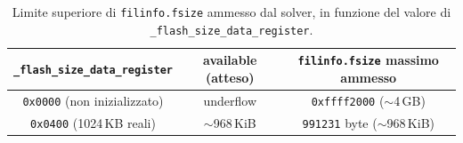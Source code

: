 \begin{table}[H]
        \centering
        \small
        \begin{tabular}{c c c}
        \toprule
        \textbf{\texttt{\_flash\_size\_data\_register}} & \textbf{available (atteso)} & \textbf{\texttt{filinfo.fsize} massimo ammesso} \\
        \midrule
        \texttt{0x0000} (non inizializzato) & underflow & \texttt{0xffff2000} ($\sim$4\,GB) \\
        \midrule
        \texttt{0x0400} (1024\,KB reali) & $\sim$968\,KiB & \texttt{991231} byte ($\sim$968\,KiB) \\
        \bottomrule
        \end{tabular}
        \caption{Limite superiore di \texttt{filinfo.fsize} ammesso dal solver, in funzione del valore di \texttt{\_flash\_size\_data\_register}.}
        \label{tab:underflow}
        \end{table}
        \FloatBarrier